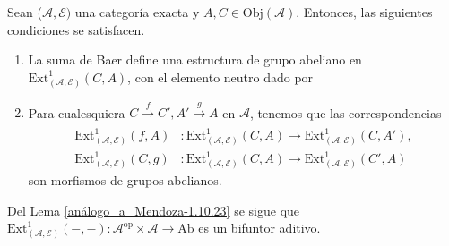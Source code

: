 \documentclass[tesis]{subfiles}
\begin{document}
\begin{Lema}\label{análogo_a_Mendoza-1.10.23}
    Sean ($\mathscr{A},\mathscr{E})$ una categoría exacta y $A,C\in\text{Obj}(\mathscr{A})$. Entonces, las siguientes condiciones se satisfacen.

    \begin{enumerate}[label=(\alph*)]
    
        \item La suma de Baer define una estructura de grupo abeliano en $\text{Ext}_{(\mathscr{A},\mathscr{E})}^{1}(C,A)$, con el elemento neutro dado por
            \begin{center}
            \end{center}

        \item Para cualesquiera $C\xrightarrow[]{f}C', A'\xrightarrow[]{g}A$ en $\mathscr{A}$, tenemos que las correspondencias
            \begin{align*}
                \text{Ext}_{(\mathscr{A},\mathscr{E})}^{1}(f,A) &:\text{Ext}_{(\mathscr{A},\mathscr{E})}^{1}(C,A) \to \text{Ext}_{(\mathscr{A},\mathscr{E})}^{1}(C,A'), \\
                \text{Ext}_{(\mathscr{A},\mathscr{E})}^{1}(C,g) &:\text{Ext}_{(\mathscr{A},\mathscr{E})}^{1}(C,A) \to \text{Ext}_{(\mathscr{A},\mathscr{E})}^{1}(C',A) 
            \end{align*}
            son morfismos de grupos abelianos.
    \end{enumerate}
\end{Lema}

\begin{Obs}\label{Obs: Funtor Ext1 en categorías exactas}
    Del Lema \ref{análogo_a_Mendoza-1.10.23} se sigue que $\text{Ext}_{(\mathscr{A},\mathscr{E})}^{1}(-,-):\mathscr{A}^\text{op}\times\mathscr{A}\to \text{Ab}$ es un bifuntor aditivo.
\end{Obs}
\end{document}
